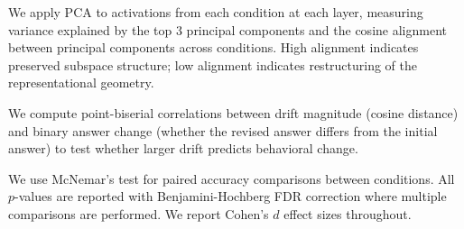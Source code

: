 We apply PCA to activations from each condition at each layer, measuring variance explained by the top 3 principal components and the cosine alignment between principal components across conditions. High alignment indicates preserved subspace structure; low alignment indicates restructuring of the representational geometry.

 We compute point-biserial correlations between drift magnitude (cosine distance) and binary answer change (whether the revised answer differs from the initial answer) to test whether larger drift predicts behavioral change.

 We use McNemar's test for paired accuracy comparisons between conditions. All $p$-values are reported with Benjamini-Hochberg FDR correction where multiple comparisons are performed. We report Cohen's $d$ effect sizes throughout.
